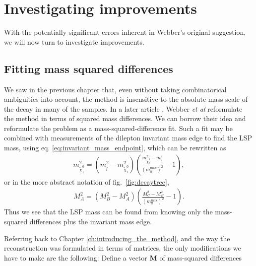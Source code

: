\documentclass[twoside,english]{uiofysmaster}
\begin{document}
\chapter{Investigating improvements}%
With the potentially significant errors inherent in Webber's original suggestion, we will now turn to investigate improvements.


\section{Fitting mass squared differences}
We saw in the previous chapter that, even without taking combinatorical ambiguities into account, the method is insensitive to the absolute mass scale of the decay in many of the samples. In a later article \cite{Nojiri:2010dk}, Webber {\it et al} reformulate the method in terms of squared mass differences. We can borrow their idea and reformulate the problem as a mass-squared-difference fit. Such a fit may be combined with measurements of the dilepton invariant mass edge to find the LSP mass, using eq. \eqref{eq:invariant_mass_endpoint}, which can be rewritten as
\begin{align}
	m^2_{\tilde\chi_1^0} = (m^2_{\tilde l} - m^2_{\tilde \chi_1^0})\left(\frac{m^2_{\tilde\chi_2^0} - m^2_{\tilde l}}{(m_{ll}^\mathrm{max})^2} - 1\right),
\end{align}
or in the more abstract notation of fig.\ \ref{fig:decaytree},
\begin{align}
	M^2_A = (M^2_B - M^2_A)\left(\frac{M^2_C - M^2_B}{(m_{ll}^\mathrm{max})^2} - 1\right).\label{eq:MLSP_dilepton_edge}
\end{align}
Thus we see that the LSP mass can be found from knowing only the mass-squared differences plus the invariant mass edge.

Referring back to Chapter \ref{ch:introducing_the_method}, and the way the reconstruction was formulated in terms of matrices, the only modifications we have to make are the following: Define a vector $\mathbf{M}$ of mass-squared differences
\end{document}
